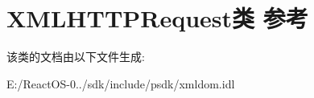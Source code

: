 \hypertarget{class_x_m_l_h_t_t_p_request}{}\section{X\+M\+L\+H\+T\+T\+P\+Request类 参考}
\label{class_x_m_l_h_t_t_p_request}


该类的文档由以下文件生成\+:\begin{DoxyCompactItemize}
\item 
E\+:/\+React\+O\+S-\/0../sdk/include/psdk/xmldom.\+idl\end{DoxyCompactItemize}

